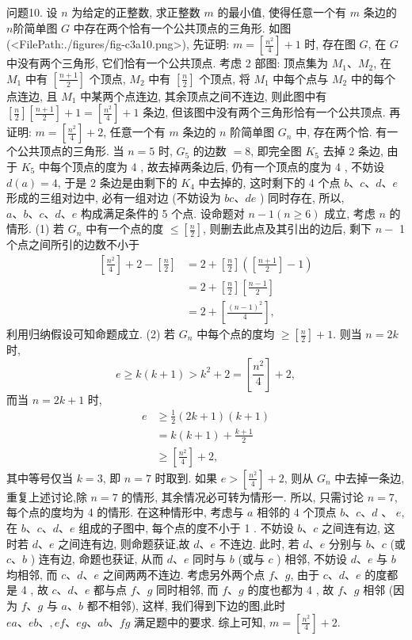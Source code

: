 问题10. 设 $n$ 为给定的正整数, 求正整数 $m$ 的最小值, 使得任意一个有 $m$ 条边的 $n$阶简单图 $G$ 中存在两个恰有一个公共顶点的三角形.
如图(<FilePath:./figures/fig-c3a10.png>), 
先证明: $m=\left[\frac{n^2}{4}\right]+1$ 时, 存在图 $G$, 在 $G$ 中没有两个三角形, 它们恰有一个公共顶点.
考虑 2 部图: 顶点集为 $M_1 、 M_2$, 在 $M_1$ 中有 $\left[\frac{n+1}{2}\right]$ 个顶点, $M_2$ 中有 $\left[\frac{n}{2}\right]$ 个顶点, 将 $M_1$ 中每个点与 $M_2$ 中的每个点连边, 且 $M_1$ 中某两个点连边, 其余顶点之间不连边, 则此图中有 $\left[\frac{n}{2}\right]\left[\frac{n+1}{2}\right]+1=\left[\frac{n^2}{4}\right]+1$ 条边, 但该图中没有两个三角形恰有一个公共顶点.
再证明: $m=\left[\frac{n^2}{4}\right]+2$, 任意一个有 $m$ 条边的 $n$ 阶简单图 $G_n$ 中, 存在两个恰.
有一个公共顶点的三角形.
当 $n=5$ 时, $G_5$ 的边数 $=8$, 即完全图 $K_5$ 去掉 2 条边, 由于 $K_5$ 中每个顶点的度为 4 , 故去掉两条边后, 仍有一个顶点的度为 4 , 不妨设 $d(a)=4$, 于是 2 条边是由剩下的 $K_4$ 中去掉的, 这时剩下的 4 个点 $b 、 c 、 d 、 e$ 形成的三组对边中, 必有一组对边 (不妨设为 $b c 、 d e$ ) 同时存在, 所以, $a 、 b 、 c 、 d 、 e$ 构成满足条件的 5 个点.
设命题对 $n-1(n \geqslant 6)$ 成立, 考虑 $n$ 的情形.
(1) 若 $G_n$ 中有一个点的度 $\leqslant\left[\frac{n}{2}\right]$, 则删去此点及其引出的边后, 剩下 $n-$ 1 个点之间所引的边数不小于
$$
\begin{aligned}
{\left[\frac{n^2}{4}\right]+2-\left[\frac{n}{2}\right] } & =2+\left[\frac{n}{2}\right]\left(\left[\frac{n+1}{2}\right]-1\right) \\
& =2+\left[\frac{n}{2}\right]\left[\frac{n-1}{2}\right] \\
& =2+\left[\frac{(n-1)^2}{4}\right],
\end{aligned}
$$
利用归纳假设可知命题成立.
(2) 若 $G_n$ 中每个点的度均 $\geqslant\left[\frac{n}{2}\right]+1$. 则当 $n=2 k$ 时,
$$
e \geqslant k(k+1)>k^2+2=\left[\frac{n^2}{4}\right]+2,
$$
而当 $n=2 k+1$ 时,
$$
\begin{aligned}
e & \geqslant \frac{1}{2}(2 k+1)(k+1) \\
& =k(k+1)+\frac{k+1}{2} \\
& \geqslant\left[\frac{n^2}{4}\right]+2,
\end{aligned}
$$
其中等号仅当 $k=3$, 即 $n=7$ 时取到.
如果 $e>\left[\frac{n^2}{4}\right]+2$, 则从 $G_n$ 中去掉一条边, 重复上述讨论,除 $n=7$ 的情形, 其余情况必可转为情形一.
所以, 只需讨论 $n=7$, 每个点的度均为 4 的情形.
在这种情形中, 考虑与 $a$ 相邻的 4 个顶点 $b 、 c 、 d$ 、 $e$, 在 $b 、 c 、 d 、 e$ 组成的子图中, 每个点的度不小于 1 . 不妨设 $b 、 c$ 之间连有边, 这时若 $d 、 e$ 之间连有边, 则命题获证,故 $d 、 e$ 不连边.
此时, 若 $d 、 e$ 分别与 $b 、 c$ (或 $c 、 b$ ) 连有边, 命题也获证, 从而 $d 、 e$ 同时与 $b$ (或与 $c$ ) 相邻, 不妨设 $d 、 e$ 与 $b$ 均相邻, 而 $c 、 d 、 e$ 之间两两不连边.
考虑另外两个点 $f 、 g$, 由于 $c 、 d 、 e$ 的度都是 4 , 故 $c 、 d 、 e$ 都与点 $f 、 g$ 同时相邻, 而 $f 、 g$ 的度也都为 4 , 故 $f 、 g$ 相邻 (因为 $f 、 g$ 与 $a 、 b$ 都不相邻), 这样, 我们得到下边的图,此时 $e a 、 e b 、, e f 、 e g 、 a b 、 f g$ 满足题中的要求.
综上可知, $m=\left[\frac{n^2}{4}\right]+2$.


